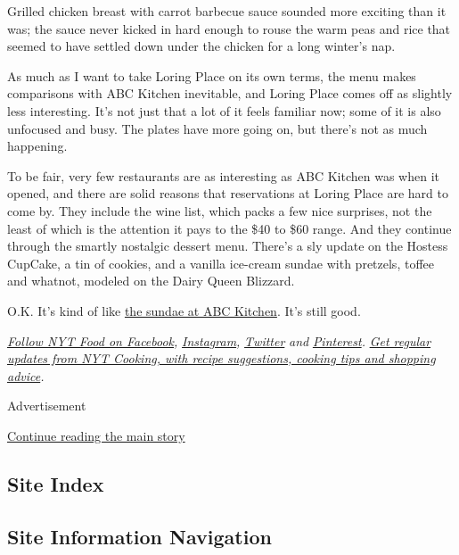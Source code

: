 Grilled chicken breast with carrot barbecue sauce sounded more exciting
than it was; the sauce never kicked in hard enough to rouse the warm
peas and rice that seemed to have settled down under the chicken for a
long winter's nap.

As much as I want to take Loring Place on its own terms, the menu makes
comparisons with ABC Kitchen inevitable, and Loring Place comes off as
slightly less interesting. It's not just that a lot of it feels familiar
now; some of it is also unfocused and busy. The plates have more going
on, but there's not as much happening.

To be fair, very few restaurants are as interesting as ABC Kitchen was
when it opened, and there are solid reasons that reservations at Loring
Place are hard to come by. They include the wine list, which packs a few
nice surprises, not the least of which is the attention it pays to the
\$40 to \$60 range. And they continue through the smartly nostalgic
dessert menu. There's a sly update on the Hostess CupCake, a tin of
cookies, and a vanilla ice-cream sundae with pretzels, toffee and
whatnot, modeled on the Dairy Queen Blizzard.

O.K. It's kind of like
\href{https://www.jamesbeard.org/recipes/salted-caramel-ice-cream-sundae}{the
sundae at ABC Kitchen}. It's still good.

\href{https://www.facebookcorewwwi.onion/nytfood/}{\emph{Follow NYT Food
on Facebook}}\emph{,}
\href{https://instagram.com/nytfood}{\emph{Instagram}}\emph{,}
\href{https://twitter.com/nytfood}{\emph{Twitter}} \emph{and}
\href{https://www.pinterest.com/nytfood/}{\emph{Pinterest}}\emph{.}
\href{https://www.nytimes3xbfgragh.onion/newsletters/cooking}{\emph{Get
regular updates from NYT Cooking, with recipe suggestions, cooking tips
and shopping advice}}\emph{.}

Advertisement

\protect\hyperlink{after-bottom}{Continue reading the main story}

\hypertarget{site-index}{%
\subsection{Site Index}\label{site-index}}

\hypertarget{site-information-navigation}{%
\subsection{Site Information
Navigation}\label{site-information-navigation}}

